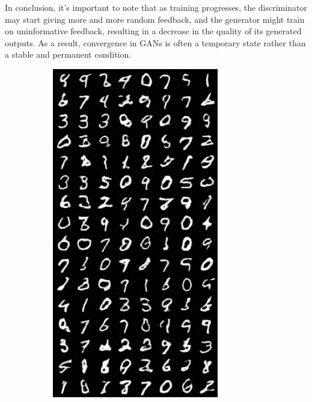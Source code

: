 In conclusion, it's important to note that as training progresses, the discriminator may start giving more and more random feedback, and the generator might train on uninformative feedback, resulting in a decrease in the quality of its generated outputs. As a result, convergence in GANs is often a temporary state rather than a stable and permanent condition.

\begin{figure}[H]
    \centering

    \begin{subfigure}{0.2\textwidth}
        \centering
        \includegraphics[width=0.95\linewidth]{longer_epochs/fake_sample_epoch_0010.png}

\end{subfigure}
\end{figure}
